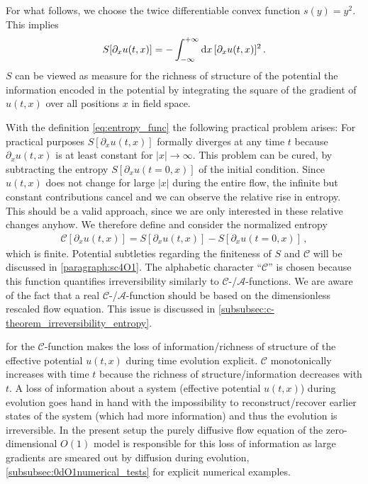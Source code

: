 For what follows, we choose the twice differentiable convex function $s ( y ) = y^2$. This implies
\begin{align}
	S [ \partial_x u ( t, x ) ] = - \int_{-\infty}^{+\infty} \dif x \, [ \partial_x u ( t, x ) ]^2 \, .	\label{eq:entropy_func}
\end{align}
$S$ can be viewed as measure for the richness of structure of the potential \dash{} the information encoded in the potential \dash{} by integrating the square of the gradient of $u(t,x)$ over all positions $x$ in field space.

With the definition \eqref{eq:entropy_func} the following practical problem arises: For practical purposes $S [ \partial_x u ( t, x ) ]$ formally diverges at any time $t$ because $\partial_x u ( t, x )$ is at least constant for $|x| \rightarrow \infty$.
This problem can be cured, by subtracting the entropy $S [ \partial_x u ( t = 0, x ) ]$ of the initial condition.
Since $u ( t, x )$ does not change for large $|x|$ during the entire \frg{} flow, the infinite but constant contributions cancel and we can observe the relative rise in entropy.
This should be a valid approach, since we are only interested in these relative changes anyhow.
We therefore define and consider the normalized entropy
\begin{align}
	\mathcal{C} [ \partial_x u ( t, x ) ] = S [ \partial_x u ( t, x ) ] - S [ \partial_x u ( t = 0, x ) ] \, , \label{eq:Cdef}
\end{align}
which is finite.
Potential subtleties regarding the finiteness of $S$ and $\mathcal{C}$ will be discussed in \cref{paragraph:sc4O1}.
The alphabetic character ``$\mathcal{C}$'' is chosen because this function quantifies irreversibility similarly to $\mathcal{C}$-/$\mathcal{A}$-functions.
We are aware of the fact that a real $\mathcal{C}$-/$\mathcal{A}$-function should be based on the dimensionless rescaled flow equation.
This issue is discussed in \cref{subsubsec:c-theorem_irreversibility_entropy}.

 for the $\mathcal{C}$-function makes the loss of information/richness of structure of the effective potential $u(t,x)$ during \frg{} time evolution explicit. $\mathcal{C}$ monotonically increases with \frg{} time $t$ because the richness of structure/information decreases with $t$.
A loss of information about a system (effective potential $u(t,x)$) during \rgtime{} evolution goes hand in hand with the impossibility to reconstruct/recover earlier states of the system (which had more information) and thus the \rgtime{} evolution is irreversible.
In the present setup the purely diffusive flow equation of the zero-dimensional $O(1)$ model is responsible for this loss of information as large gradients are smeared out by diffusion during \rgtime{} evolution, \cf{} \cref{subsubsec:0dO1numerical_tests} for explicit numerical examples.

